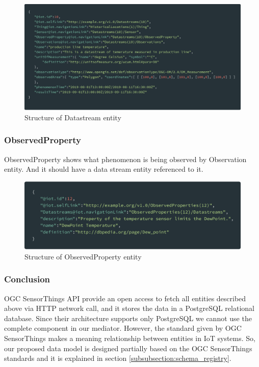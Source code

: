 	\begin{figure}[!htbp] 
		\begin{center}
			\includegraphics[scale=0.1]{./images/png/ogc/datastream}	
			\caption{Structure of Datastream entity}	
			\label{fig:datastream}	
		\end{center}
	\end{figure}


	\subsubsection{ObservedProperty}
	ObservedProperty shows what phenomenon is being observed by Observation entity. And it should have a data stream entity referenced to it.
	
	\begin{figure}[!htbp] 
		\begin{center}
			\includegraphics[scale=0.1]{./images/png/ogc/observedproperty}	
			\caption{Structure of ObservedProperty entity}	
			\label{fig:observedproperty}	
		\end{center}
	\end{figure}

	\subsubsection{Conclusion}
	OGC SensorThings API provide an open access to fetch all entities described above via HTTP network call, and it stores the data in a PostgreSQL relational database. Since their architecture supports only PostgreSQL we cannot use the complete component in our mediator. However, the standard given by OGC SensorThings makes a meaning relationship between entities in IoT systems. So, our proposed data model is designed partially based on the OGC SensorThings standards and it is explained in section \ref{subsubsection:schema_registry}. 


